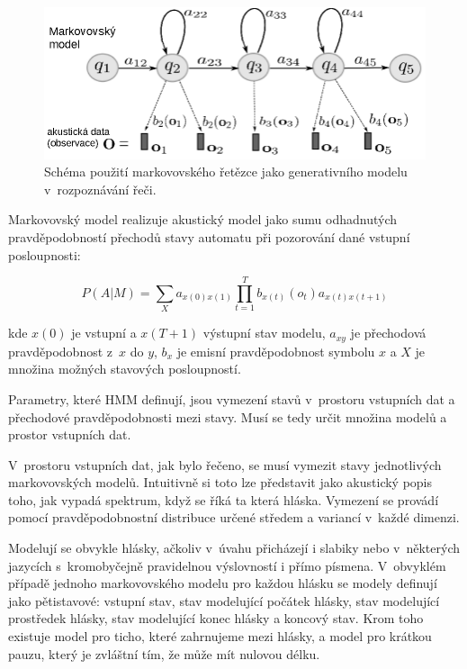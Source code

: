 \begin{figure}[htpb]
\includegraphics[scale=0.48]{rc/hmm.png}
\caption{
    Schéma použití markovovského řetězce jako generativního modelu
    v~rozpoznávání řeči.
}
\label{fig:hmm}
\end{figure}

Markovovský model realizuje akustický model jako sumu odhadnutých
pravděpodobností přechodů stavy automatu při pozorování dané vstupní
posloupnosti:

\begin{equation}
P(A|M) = \sum_X a_{x(0)x(1)} \prod_{t=1}^T b_{x(t)}(o_t)a_{x(t)x(t+1)}
\end{equation}

kde $x(0)$ je vstupní a $x(T + 1)$ výstupní stav modelu, $a_{xy}$ je přechodová
pravděpodobnost z~$x$ do $y$, $b_{x}$ je emisní pravděpodobnost symbolu $x$ a
$X$ je množina možných stavových posloupností.

Parametry, které HMM definují, jsou vymezení stavů v~prostoru vstupních dat a
přechodové pravděpodobnosti mezi stavy. Musí se tedy určit množina modelů a
prostor vstupních dat.




V~prostoru vstupních dat, jak bylo řečeno, se musí vymezit stavy jednotlivých
markovovských modelů. Intuitivně si toto lze představit jako akustický popis
toho, jak vypadá spektrum, když se říká ta která hláska. Vymezení se provádí
pomocí pravděpodobnostní distribuce určené středem a variancí v~každé dimenzi.

Modelují se obvykle hlásky, ačkoliv v~úvahu přicházejí i slabiky nebo
v~některých jazycích s~kromobyčejně pravidelnou výslovností i přímo písmena.
V~obvyklém případě jednoho markovovského modelu pro každou hlásku se modely
definují jako pětistavové: vstupní stav, stav modelující počátek hlásky, stav
modelující prostředek hlásky, stav modelující konec hlásky a koncový stav. Krom
toho existuje model pro ticho, které zahrnujeme mezi hlásky, a model pro krátkou
pauzu, který je zvláštní tím, že může mít nulovou délku.

